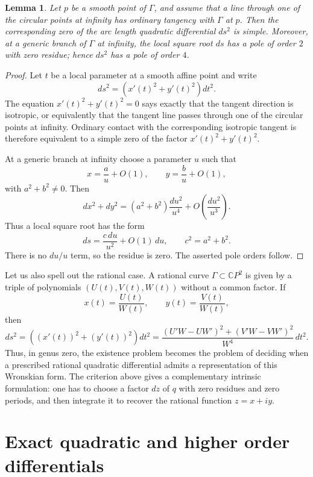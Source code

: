 \documentclass[reqno]{amsart}
\newtheorem{lemma}[theorem]{Lemma}
\newcommand{\bC}{\mathbb{C}}
\newcommand {\Ga}{\Gamma}
\theoremstyle{definition}
\theoremstyle{remark}
\theoremstyle{definition}
\theoremstyle{definition}
\theoremstyle{definition}
\begin{document}
\begin{lemma}\label{lm:res}
Let $p$ be a smooth point of $\Ga$, and assume that a line through one of the circular points at infinity has ordinary tangency with $\Ga$ at $p$. Then the corresponding zero of the arc length quadratic differential $ds^2$ is simple.
Moreover, at a generic branch of $\Ga$ at infinity, the local square root $ds$ has a pole of order $2$ with zero residue; hence $ds^2$ has a pole of order $4$.
\end{lemma}

\begin{proof}
Let $t$ be a local parameter at a smooth affine point and write
\[
 ds^2=(x'(t)^2+y'(t)^2)dt^2.
\]
The equation $x'(t)^2+y'(t)^2=0$ says exactly that the tangent direction is isotropic, or equivalently that the tangent line passes through one of the circular points at infinity. Ordinary contact with the corresponding isotropic tangent is therefore equivalent to a simple zero of the factor $x'(t)^2+y'(t)^2$.

At a generic branch at infinity choose a parameter $u$ such that
\[
 x=\frac{a}{u}+O(1),\qquad y=\frac{b}{u}+O(1),
\]
with $a^2+b^2\neq 0$. Then
\[
 dx^2+dy^2=(a^2+b^2)\frac{du^2}{u^4}+O\left(\frac{du^2}{u^3}\right).
\]
Thus a local square root has the form
\[
 ds=\frac{c\,du}{u^2}+O(1)\,du,\qquad c^2=a^2+b^2.
\]
There is no $du/u$ term, so the residue is zero. The asserted pole orders follow.
\end{proof}

Let us also spell out the rational case.  A rational curve
$\Ga\subset \bC P^2$ is given by a triple of polynomials $(U(t),V(t),W(t))$
without a common factor.  If
\[
   x(t)=\frac{U(t)}{W(t)},\qquad y(t)=\frac{V(t)}{W(t)},
\]
then
\[
 ds^2=\left((x'(t))^2+(y'(t))^2\right)dt^2
 = \frac{(U'W-UW')^2+(V'W-VW')^2}{W^4}\,dt^2.
\]
Thus, in genus zero, the existence problem becomes the problem of deciding
when a prescribed rational quadratic differential admits a representation of
this Wronskian form.  The criterion above gives a complementary intrinsic
formulation: one has to choose a factor $dz$ of $q$ with zero residues and zero
periods, and then integrate it to recover the rational function $z=x+iy$.

\section{Exact quadratic and higher order differentials}\label{sec:exact}
\end{document}
